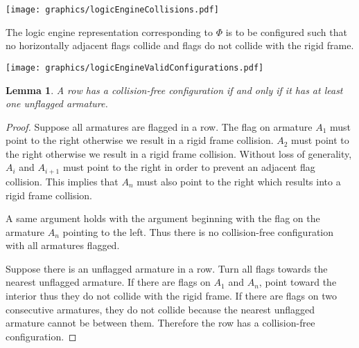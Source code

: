 \documentclass[10pt]{CSUNthesis}
\theoremstyle{plain}%
\newtheorem{lem}{Lemma}
\theoremstyle{definition}
\theoremstyle{remark}
\begin{document}
 \begin{minipage}{\linewidth}
\begin{center}
\texttt{[image: graphics/logicEngineCollisions.pdf]}
\label{fig:logicEngineCollisions.pdf}
\end{center}
\end{minipage}

The logic engine representation corresponding to $\Phi$ is to be configured such that no horizontally adjacent flags collide and flags do not collide with the rigid frame. 

\begin{minipage}{\linewidth}
\begin{center}
\texttt{[image: graphics/logicEngineValidConfigurations.pdf]}
\label{fig:logicEngineValidConfigurations.pdf}
\end{center}
\end{minipage}

\begin{lem}\label{lem:logicEngine1}A row has a collision-free configuration if and only if it has 
at least one unflagged armature. \end{lem}
\begin{proof}

Suppose all armatures are flagged in a row.  The flag on armature $A_1$ must point to the 
right otherwise we result in a rigid frame collision.  $A_2$ must point to the right otherwise 
we result in a rigid frame collision.  Without loss of generality, $A_i$ and $A_{i+1}$ must 
point to the right in order to prevent an adjacent flag collision.  This implies that $A_n$ 
must also point to the right which results into a rigid frame collision.

A same argument holds with the argument beginning with the flag 
on the armature $A_n$ pointing to the left.  Thus there is no collision-free configuration with 
all armatures flagged.


Suppose there is an unflagged armature in a row.  Turn all flags towards the nearest unflagged 
armature.  If there are flags on $A_1$ and $A_n$, point toward the interior thus they do not 
collide with the rigid frame.  If there are flags on two consecutive armatures, they do not collide 
because the nearest unflagged armature cannot be between them.  Therefore the row has a 
collision-free configuration.
\end{proof}
\end{document}

